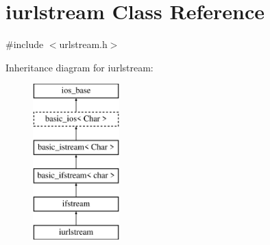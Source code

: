 \hypertarget{classiurlstream}{}\section{iurlstream Class Reference}
\label{classiurlstream}


{\ttfamily \#include $<$urlstream.\+h$>$}

Inheritance diagram for iurlstream\+:\begin{figure}[H]
\begin{center}
\leavevmode
\includegraphics[height=6.000000cm]{classiurlstream}
\end{center}
\end{figure}
